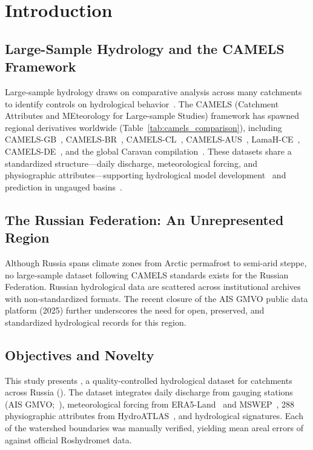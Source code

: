 \section{Introduction}
\label{sec:introduction}

\subsection{Large-Sample Hydrology and the CAMELS Framework}
Large-sample hydrology draws on comparative analysis across many catchments to identify controls on hydrological behavior~\citep{Addor2017}.
The CAMELS (Catchment Attributes and MEteorology for Large-sample Studies) framework has spawned regional derivatives worldwide (Table~\ref{tab:camels_comparison}), including CAMELS-GB~\citep{Coxon2020}, CAMELS-BR~\citep{Chagas2020}, CAMELS-CL~\citep{AlvarezGarreton2018}, CAMELS-AUS~\citep{Fowler2021}, LamaH-CE~\citep{Klingler2021}, CAMELS-DE~\citep{Hoege2022}, and the global Caravan compilation~\citep{Kratzert2023}.
These datasets share a standardized structure---daily discharge, meteorological forcing, and physiographic attributes---supporting hydrological model development~\citep{Kratzert2019} and prediction in ungauged basins~\citep{Wagener2004}.



\subsection{The Russian Federation: An Unrepresented Region}
Although Russia spans climate zones from Arctic permafrost to semi-arid steppe, no large-sample dataset following CAMELS standards exists for the Russian Federation.
Russian hydrological data are scattered across institutional archives with non-standardized formats.
The recent closure of the AIS GMVO public data platform (2025) further underscores the need for open, preserved, and standardized hydrological records for this region.

\subsection{Objectives and Novelty}
This study presents \dataset, a quality-controlled hydrological dataset for \ntotal catchments across Russia (\years).
The dataset integrates daily discharge from \ndischarge gauging stations (AIS GMVO;~\citealt{AIS_GMVO}), meteorological forcing from ERA5-Land~\citep{Munoz2021} and MSWEP~\citep{Beck2019MSWEP}, 288 physiographic attributes from HydroATLAS~\citep{Linke2019}, and \nsignatures hydrological signatures.
Each of the \ntotal watershed boundaries was manually verified, yielding mean areal errors of \meanerror against official Roshydromet data.

